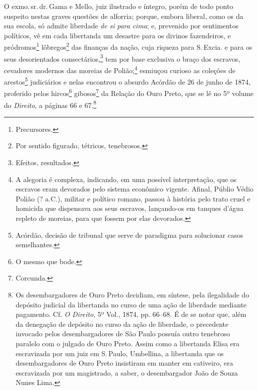 {O exmo.\,sr.\,dr.\,Gama e Mello, juiz ilustrado e íntegro, porém de todo
ponto suspeito nestas graves questões de alforria; porque, embora
liberal, como os da sua escola, só admite liberdade \emph{de si para
cima}; e, prevenido por sentimentos políticos, vê em cada libertanda um
desastre para os divinos fazendeiros, e pródromos\footnote{
  Precursores.} lôbregos\footnote{Por sentido figurado, tétricos,
  tenebrosos.} das finanças da nação, cuja riqueza para S.\,Excia. e para
os seus desorientados consectários,\footnote{Efeitos, resultados.} tem
por base exclusiva o braço dos escravos, cevadores modernos das moreias
de Polião;\footnote{A alegoria é complexa, indicando, em uma possível
  interpretação, que os escravos eram devorados pelo sistema econômico vigente.
  Afinal, Públio Védio Polião (? a.C.), militar e político romano,
  passou à história pelo trato cruel e homicida que dispensava aos seus
  escravos, lançando-os em tanques d'água repleto de moreias, para que
  fossem por elas devorados.} esmiuçou curioso as coleções de
arestos\footnote{Acórdão, decisão de tribunal que serve de paradigma
  para solucionar casos semelhantes.} judiciários e nelas encontrou o
absurdo Acórdão de 26 de junho de 1874, proferido pelos hircos\footnote{
  O mesmo que bode.} gibosos\footnote{Corcunda.} da Relação do Ouro
Preto, que se lê no 5º volume do \emph{Direito}, a páginas 66 e
67.\footnote{Os desembargadores de Ouro Preto decidiam, em síntese,
  pela ilegalidade do depósito judicial da libertanda no curso de uma
  ação de liberdade mediante pagamento. Cf. \emph{O Direito}, 5º Vol.,
  1874, pp. 66--68. É de se notar que, além da denegação de depósito no
  curso da ação de liberdade, o precedente invocado pelos
  desembargadores de São Paulo possuía outro tenebroso paralelo com o
  julgado de Ouro Preto. Assim como a libertanda Elisa era escravizada
  por um juiz em S.\,Paulo, Umbellina, a libertanda que os
  desembargadores de Ouro Preto insistiram em manter em cativeiro, era
  escravizada por um magistrado, a saber, o desembargador João de Souza
  Nunes Lima.}

}
